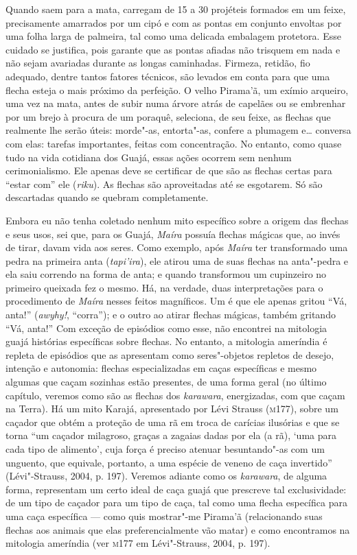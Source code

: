 Quando saem para a mata, carregam de 15 a 30 projéteis formados em um
feixe, precisamente amarrados por um cipó e com as pontas em conjunto
envoltas por uma folha larga de palmeira, tal como uma delicada
embalagem protetora. Esse cuidado se justifica, pois garante que as
pontas afiadas não trisquem em nada e não sejam avariadas durante as
longas caminhadas. Firmeza, retidão, fio adequado, dentre tantos fatores
técnicos, são levados em conta para que uma flecha esteja o mais próximo
da perfeição. O velho Pirama'ã, um exímio arqueiro, uma vez na mata,
antes de subir numa árvore atrás de capelães ou se embrenhar por um
brejo à procura de um poraquê, seleciona, de seu feixe, as flechas que
realmente lhe serão úteis: morde"-as, entorta"-as, confere a plumagem e\ldots{}
conversa com elas: tarefas importantes, feitas com concentração. No
entanto, como quase tudo na vida cotidiana dos Guajá, essas ações
ocorrem sem nenhum cerimonialismo. Ele apenas deve se certificar de que
são as flechas certas para ``estar com'' ele (\emph{riku}). As flechas são
aproveitadas até se esgotarem. Só são descartadas quando se quebram
completamente.

Embora eu não tenha coletado nenhum mito específico sobre a origem das
flechas e seus usos, sei que, para os Guajá, \emph{Maíra} possuía
flechas mágicas que, ao invés de tirar, davam vida aos seres. Como
exemplo, após \emph{Maíra} ter transformado uma pedra na primeira anta
(\emph{tapi'ira}), ele atirou uma de suas flechas na anta"-pedra e ela
saiu correndo na forma de anta; e quando transformou um cupinzeiro no
primeiro queixada fez o mesmo. Há, na verdade, duas interpretações para
o procedimento de \emph{Maíra} nesses feitos magníficos. Um é que ele
apenas gritou ``Vá, anta!'' (\emph{awyhy!}, ``corra''); e o outro ao atirar
flechas mágicas, também gritando ``Vá, anta!'' Com exceção de episódios
como esse, não encontrei na mitologia guajá
histórias específicas sobre flechas. No entanto, a mitologia ameríndia é
repleta de episódios que as apresentam como seres"-objetos repletos de
desejo, intenção e autonomia: flechas especializadas em caças
específicas e mesmo algumas que caçam sozinhas estão presentes, de uma
forma geral (no último capítulo, veremos como são as flechas dos
\emph{karawara}, energizadas, com que caçam na Terra). Há um mito
Karajá, apresentado por Lévi Strauss (\textsc{m}177), sobre um caçador que obtém
a proteção de uma rã em troca de carícias ilusórias e que se torna ``um
caçador milagroso, graças a zagaias dadas por ela (a rã), `uma para
cada tipo de alimento', cuja força é preciso atenuar
besuntando"-as com um unguento, que equivale, portanto, a uma espécie de
veneno de caça invertido'' (Lévi"-Strauss, 2004, p. 197). Veremos adiante
como os \emph{karawara}, de alguma forma, representam um certo ideal de
caça guajá que prescreve tal exclusividade: de um tipo de caçador para
um tipo de caça, tal como uma flecha específica para uma caça específica
--- como quis mostrar"-me Pirama'ã (relacionando suas flechas aos animais
que elas preferencialmente vão matar) e como encontramos na mitologia
ameríndia (ver \textsc{m}177 em Lévi"-Strauss, 2004, p. 197).


